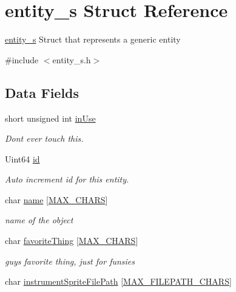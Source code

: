 \hypertarget{structentity__s}{}\section{entity\+\_\+s Struct Reference}
\label{structentity__s}


\hyperlink{structentity__s}{entity\+\_\+s} Struct that represents a generic entity  




{\ttfamily \#include $<$entity\+\_\+s.\+h$>$}

\subsection*{Data Fields}
\begin{DoxyCompactItemize}
\item 
short unsigned int \hyperlink{structentity__s_a13159f6b47122dc47eb11b1653a1663a}{in\+Use}
\begin{DoxyCompactList}\small\item\em Don\textquotesingle{}t ever touch this. \end{DoxyCompactList}\item 
Uint64 \hyperlink{structentity__s_a4158e9a3af9337e59f9b8de984c0efba}{id}
\begin{DoxyCompactList}\small\item\em Auto increment id for this entity. \end{DoxyCompactList}\item 
char \hyperlink{structentity__s_a1a416c8de05eed27aa81f653426597d8}{name} \mbox{[}\hyperlink{entity__s_8h_a8adbf2b1e0569dded992fee665e86e70}{M\+A\+X\+\_\+\+C\+H\+A\+RS}\mbox{]}
\begin{DoxyCompactList}\small\item\em name of the object \end{DoxyCompactList}\item 
char \hyperlink{structentity__s_ae0b5157d90563d37e8209f8ba094e494}{favorite\+Thing} \mbox{[}\hyperlink{entity__s_8h_a8adbf2b1e0569dded992fee665e86e70}{M\+A\+X\+\_\+\+C\+H\+A\+RS}\mbox{]}
\begin{DoxyCompactList}\small\item\em guy\textquotesingle{}s favorite thing, just for funsies \end{DoxyCompactList}\item 
char \hyperlink{structentity__s_ae526c5db6c94436bd908917383cd3b2b}{instrument\+Sprite\+File\+Path} \mbox{[}\hyperlink{entity__s_8h_ac0bfa0f6f2de4169dd0df48602b67146}{M\+A\+X\+\_\+\+F\+I\+L\+E\+P\+A\+T\+H\+\_\+\+C\+H\+A\+RS}\mbox{]}

\end{DoxyCompactItemize}
